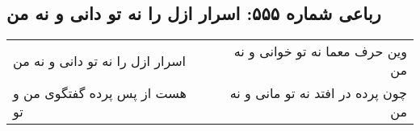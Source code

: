 \begin{center}
\section*{رباعی شماره ۵۵۵: اسرار ازل را نه تو دانی و نه من}
\label{sec:sh555}
\begin{longtable}{l p{0.5cm} r}
اسرار ازل را نه تو دانی و نه من
&&
وین حرف معما نه تو خوانی و نه من
\\
هست از پس پرده گفتگوی من و تو
&&
چون پرده در افتد نه تو مانی و نه من
\\
\end{longtable}
\end{center}
